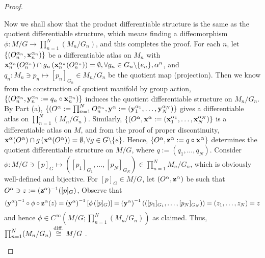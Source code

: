 {\begin{proof}
\begin{enumerate}[(a)]
	Now we shall show that the product differentiable structure is the same as the quotient differentiable structure, which means finding a diffeomorphism $\phi: M/G \rightarrow \prod_{n=1}^N (M_n/G_n)$, and this completes the proof. For each $n$, let $\{(O_n^{\alpha_n}, \mathbf{x}_n^{\alpha_n})\}$ be a differentiable atlas on $M_n$ with	$ \mathbf{x}_n^{\alpha_n}(O_n^{\alpha_n}) \cap g_n\left(\mathbf{x}_n^{\alpha_n}(O_n^{\alpha_n})\right) = \emptyset, \forall g_n \in G_n\backslash\{e_n\}, \alpha^n$, and ${ q_n: M_n \ni p_n \mapsto [p_n]_{G_n} \in M_n/G_n }$ be the quotient map (projection). Then we know from the construction of quotient manifold by group action, $\{(O_n^{\alpha_n}, \mathbf{y}_n^{\alpha_n}:= q_n \circ \mathbf{x}_n^{\alpha_n})\}$ induces the quotient differentiable structure on $M_n/G_n$. By Part (a), $\{(O^\alpha:= \prod_{n=1}^N O_n^{\alpha_n}, \mathbf{y}^\alpha:= (\mathbf{y}_1^{\alpha_1}, \dots, \mathbf{y}_N^{\alpha_N})\}$ gives a differentiable atlas on $\prod_{n=1}^N (M_n/G_n)$. Similarly, ${ \{(O^{\alpha}, \mathbf{x}^{\alpha}:= (\mathbf{x}_1^{\alpha_1}, \dots, \mathbf{x}_N^{\alpha_N})\} }$ is a differentiable atlas on $M$, and from the proof of proper discontinuity, ${ \mathbf{x}^\alpha(O^\alpha) \cap g\left(\mathbf{x}^\alpha(O^\alpha)\right) = \emptyset }, { \forall g \in G\backslash\{e\} }$. Hence, ${ \{O^\alpha, \mathbf{z}^\alpha:= q \circ \mathbf{x}^\alpha\} }$ determines the quotient differentiable structure on $M/G$, where ${ q:= (q_1, \dots, q_N) }$. Consider ${ \phi:M/G \ni [p]_G \mapsto ([p_1]_{G_1}, \dots, [p_N]_{G_N}) \in \prod_{n=1}^N M_n/G_n }$, which is obviously well-defined and bijective. For $[p]_G \in M/G$, let ${ (O^\alpha, \mathbf{z}^\alpha) }$ be such that ${ O^\alpha \ni z:=(\mathbf{z}^\alpha)^{-1}([p]_G) }$, Observe that 
	\[ \left( \mathbf{y}^\alpha \right)^{-1} \circ \phi \circ \mathbf{z}^\alpha (z) 
	= \left( \mathbf{y}^\alpha \right)^{-1} \left[ \phi \left([p]_G\right) \right]
	= \left( \mathbf{y}^\alpha \right)^{-1}\left(([p_1]_{G_1}, \dots, [p_N]_{G_N})\right)
	= (z_1, \dots, z_N) = z
	\]
	and hence ${ \phi \in C^\infty(M/G;\prod_{n=1}^N (M_n/G_n)) }$ as claimed. Thus, ${ \prod_{n=1}^N (M_n/G_n) \stackrel{\mathrm{diff.}}{\cong} M/G }$ .
	
\end{enumerate}
\end{proof}

}